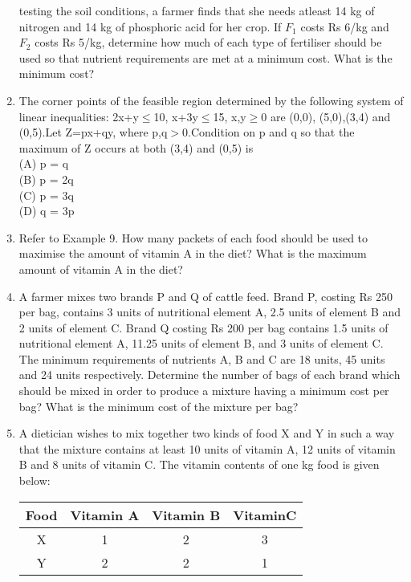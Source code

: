 \begin{enumerate}[label=\arabic*.,ref=\thesubsection.\theenumi]
testing the soil conditions, a farmer finds that she needs atleast 14 kg of nitrogen
and 14 kg of phosphoric acid for her crop. If $F_{1}$ costs Rs 6/kg and $F_{2}$ costs
Rs 5/kg, determine how much of each type of fertiliser should be used so that
nutrient requirements are met at a minimum cost. What is the minimum cost?\\
\item The corner points of the feasible region determined by the following system of
linear inequalities:
2x+y$\leq$10, x+3y$\leq$15, x,y$\geq$0 are (0,0), (5,0),(3,4) and (0,5).Let
Z=px+qy, where p,q$>$0.Condition on p and q so that the maximum of Z
occurs at both (3,4) and (0,5) is\\
(A) p = q\\
(B) p = 2q\\
(C) p = 3q\\
(D) q = 3p\\
\item Refer to Example 9. How many packets of each food should be used to maximise
the amount of vitamin A in the diet? What is the maximum amount of vitamin A
in the diet?\\
\item A farmer mixes two brands P and Q of cattle feed. Brand P, costing Rs 250 per
bag, contains 3 units of nutritional element A, 2.5 units of element B and 2 units
of element C. Brand Q costing Rs 200 per bag contains 1.5 units of nutritional
element A, 11.25 units of element B, and 3 units of element C. The minimum
requirements of nutrients A, B and C are 18 units, 45 units and 24 units respectively.
Determine the number of bags of each brand which should be mixed in order to
produce a mixture having a minimum cost per bag? What is the minimum cost of
the mixture per bag?\\
\item A dietician wishes to mix together two kinds of food X and Y in such a way that
the mixture contains at least 10 units of vitamin A, 12 units of vitamin B and
8 units of vitamin C. The vitamin contents of one kg food is given below:\\
\begin{tabular}{|c|c|c|c|}
\hline
\textbf{Food} &\textbf{Vitamin A} &\textbf{Vitamin B} & \textbf{VitaminC}\\
\hline
X & 1 & 2 & 3\\
\hline
Y &2 &2 &1\\
\hline



\end{tabular}
\end{enumerate}

